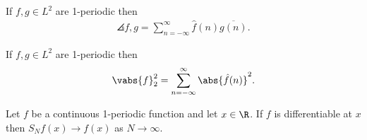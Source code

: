 \documentclass{article}
\begin{document}
\begin{theorem}[Parseval]
	If $f,g\in L^2$ are 1-periodic then
	\begin{align*}
		\angles{f,g} = \sum_{n=-\infty}^\infty \hat f(n)\overline{g(n)}.
	\end{align*}
\end{theorem}

\begin{corollary*}
	If $f,g\in L^2$ are 1-periodic then
	\begin{align*}
		\vabs{f}_2^2 = \sum_{n=-\infty}^\infty \abs{\hat f(n)}^2.
	\end{align*}
\end{corollary*}

\begin{theorem}
	Let $f$ be a continuous 1-periodic function and let $x\in\R$. If $f$ is differentiable
	at $x$ then $S_Nf(x)\to f(x)$ as $N\to\infty$.
\end{theorem}
\end{document}
